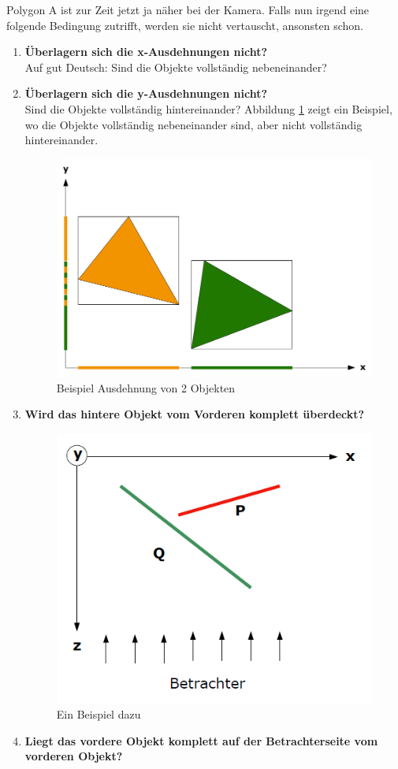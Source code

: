 Polygon A ist zur Zeit jetzt ja näher bei der Kamera. Falls nun irgend eine folgende Bedingung zutrifft, werden sie nicht vertauscht, ansonsten schon.

\begin{enumerate}
	\item \textbf{Überlagern sich die x-Ausdehnungen nicht?} \\
	Auf gut Deutsch: Sind die Objekte vollständig nebeneinander?
	\item \textbf{Überlagern sich die y-Ausdehnungen nicht?} \\
	Sind die Objekte vollständig hintereinander? Abbildung \ref{fig:ausdehnungen} zeigt ein Beispiel, wo die Objekte vollständig nebeneinander sind, aber nicht vollständig hintereinander.
	\begin{figure}[!ht]
		\centering
		\includegraphics[width=0.5\linewidth]{fig/ausdehnungen}
		\caption{Beispiel Ausdehnung von 2 Objekten}
		\label{fig:ausdehnungen}
	\end{figure}
	\item \textbf{Wird das hintere Objekt vom Vorderen komplett überdeckt?}\\
	\begin{figure}[!ht]
		\centering
		\includegraphics[width=0.5\linewidth]{fig/tiefensortierung_3}
		\caption{Ein Beispiel dazu}
		\label{fig:tiefensortierung_3}
	\end{figure}
	\item \textbf{Liegt das vordere Objekt komplett auf der Betrachterseite vom vorderen Objekt?}\\

\end{enumerate}
